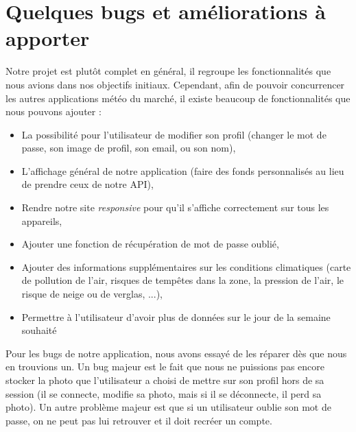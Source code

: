 \documentclass[12pt, french]{article}
\begin{document}
	\section{Quelques bugs et améliorations à apporter}
	Notre projet est plutôt complet en général, il regroupe les fonctionnalités que nous avions dans nos objectifs initiaux. Cependant, afin de pouvoir concurrencer les autres applications météo du marché, il existe beaucoup de fonctionnalités que nous pouvons ajouter :
    \begin{itemize}
        \item La possibilité pour l'utilisateur de modifier son profil (changer le mot de passe, son image de profil, son email, ou son nom),
        \item L'affichage général de notre application (faire des fonds personnalisés au lieu de prendre ceux de notre API),
        \item Rendre notre site \textit{responsive} pour qu'il s'affiche correctement sur tous les appareils,
        \item Ajouter une fonction de récupération de mot de passe oublié,
        \item Ajouter des informations supplémentaires sur les conditions climatiques (carte de pollution de l'air, risques de tempêtes dans la zone, la pression de l'air, le risque de neige ou de verglas, ...),
        \item Permettre à l'utilisateur d'avoir plus de données sur le jour de la semaine souhaité
    \end{itemize}
    Pour les bugs de notre application, nous avons essayé de les réparer dès que nous en trouvions un. Un bug majeur est le fait que nous ne puissions pas encore stocker la photo que l'utilisateur a choisi de mettre sur son profil hors de sa session (il se connecte, modifie sa photo, mais si il se déconnecte, il perd sa photo). Un autre problème majeur est que si un utilisateur oublie son mot de passe, on ne peut pas lui retrouver et il doit recréer un compte.

	
\end{document}
